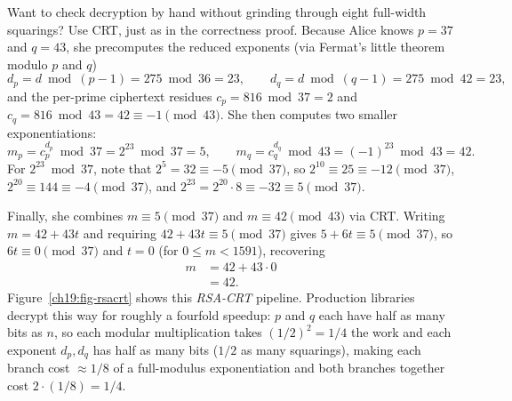 \begin{walkbox}
Want to check decryption by hand without grinding through eight full-width squarings? Use CRT, just as in the correctness proof. Because Alice knows $p=37$ and $q=43$, she precomputes the reduced exponents (via Fermat's little theorem modulo $p$ and $q$)
\[
  d_p = d\bmod(p-1) = 275\bmod 36 = 23, \qquad
  d_q = d\bmod(q-1) = 275\bmod 42 = 23,
\]
and the per-prime ciphertext residues $c_p = 816\bmod 37 = 2$ and $c_q = 816\bmod 43 = 42 \equiv -1 \pmod{43}$. She then computes two smaller exponentiations:
\[
  m_p = c_p^{d_p}\bmod 37 = 2^{23}\bmod 37 = 5, \qquad
  m_q = c_q^{d_q}\bmod 43 = (-1)^{23}\bmod 43 = 42.
\]
For $2^{23} \bmod 37$, note that $2^5 = 32 \equiv -5 \pmod{37}$, so $2^{10} \equiv 25 \equiv -12 \pmod{37}$, $2^{20} \equiv 144 \equiv -4 \pmod{37}$, and $2^{23} = 2^{20}\cdot 8 \equiv -32 \equiv 5 \pmod{37}$.

Finally, she combines $m \equiv 5 \pmod{37}$ and $m \equiv 42 \pmod{43}$ via CRT. Writing $m = 42 + 43t$ and requiring $42 + 43t \equiv 5 \pmod{37}$ gives $5 + 6t \equiv 5 \pmod{37}$, so $6t \equiv 0 \pmod{37}$ and $t = 0$ (for $0 \le m < 1591$), recovering
\begin{align*}
  m &= 42 + 43\cdot 0 \\
    &= 42.
\end{align*}
Figure~\ref{ch19:fig-rsacrt} shows this \emph{RSA-CRT} pipeline. Production libraries decrypt this way for roughly a fourfold speedup: $p$ and $q$ each have half as many bits as $n$, so each modular multiplication takes $(1/2)^2 = 1/4$ the work and each exponent $d_p, d_q$ has half as many bits ($1/2$ as many squarings), making each branch cost $\approx 1/8$ of a full-modulus exponentiation and both branches together cost $2 \cdot (1/8) = 1/4$.
\end{walkbox}

